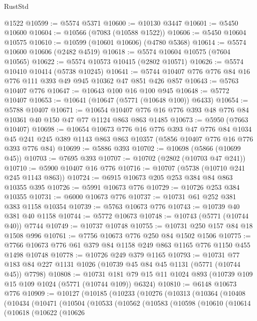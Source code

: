 \begin{lexlean}{RustStd}
\begin{coremodule}
    @1522
@10599 := @5574 @5371
@10600 := @10130 @3447
@10601 := @5450 @10600
@10604 := @10566 (@7083 (@10588 @1522))
@10606 := @5450 @10604 @10575
@10610 := @10599 (@10601 @10606) (@4780 @5368)
@10614 := @5574 @10600 @10606 (@2482 @4519)
@10618 := @5574 @10604 @10575 (@7604 @10565)
@10622 := @5574 @10573 @10415 (@2802 @10571)
@10626 := @5574 @10410 @10414 (@5738 @10245)
@10641 := @5744 @10407 @776 @776 @84 @16 @776 @111 @393 @49 @945 @10362 @47 @851 @426 @857
@10643 := @5763 @10407 @776
@10647 := @10643 @100 @16 @100 @945
@10648 := @5772 @10407
@10653 := @10641 (@10647 (@5771 (@10648 @100)) @6433)
@10654 := @5788 @10407
@10671 := @10654
    @10407
    @776
    @16
    @776
    @393
    @48
    @776
    @84
    @10361
    @40
    @150
    @47
    @77
    @1124
    @863
    @863
    @1485
@10673 := @5950 (@7663 @10407)
@10698 := @10654
    @10673
    @776
    @16
    @776
    @393
    @47
    @776
    @84
    @1034
    @45
    @241
    @245
    @389
    @1143
    @863
    @863
    @10357
    (@5856 @10407 @776 @16 @776 @393 @776 @84)
@10699 := @5886 @393
@10702 := @10698 (@5866 (@10699 @45))
@10703 := @7695 @393
@10707 := @10702 (@2802 (@10703 @47 @241))
@10710 := @5900 @10407 @16 @776
@10716 := @10707 (@5738 (@10710 @241 @245 @1143 @863))
@10724 := @6915 @10673 @205 @253 @384 @84 @863 @10355 @395
@10726 := @5991 @10673 @776
@10729 := @10726 @253 @384 @10355
@10731 := @6000 @10673 @776
@10737 := @10731 @61 @252 @381 @383 @1158 @10354
@10739 := @5763 @10673 @776
@10743 := @10739 @40 @381 @40 @1158
@10744 := @5772 @10673
@10748 := @10743 (@5771 (@10744 @40)) @7744
@10749 := @10737 @10748
@10755 := @10731 @250 @157 @84 @18 @1508 @996
@10761 := @7756 @10673 @776 @250 @84 @1502 @1506
@10775 := @7766 @10673 @776 @61 @379 @84 @1158 @249 @863 @1165 @776 @1150 @455 @1498 @10748
@10778 := @10726 @249 @379 @1165
@10793 := @10731 @77 @183 @84 @227 @1131 @1026 (@10739 @45 @84 @45 @1131 (@5771 (@10744 @45)) @7798)
@10808 := @10731
    @181
    @79
    @15
    @11
    @1024
    @893
    (@10739 @109 @15 @109 @1024 (@5771 (@10744 @109)) @6324)
@10810 := @6148 @10673 @776
@10909 := @10127
    (@10185
      (@10233
        (@10276
          (@10313
            (@10364
              (@10408
                (@10434
                  (@10471
                    (@10504
                      (@10533
                        (@10562
                          (@10583
                            (@10598
                              (@10610
                                (@10614
                                  (@10618
                                    (@10622
                                      (@10626

\end{coremodule}
\end{lexlean}
